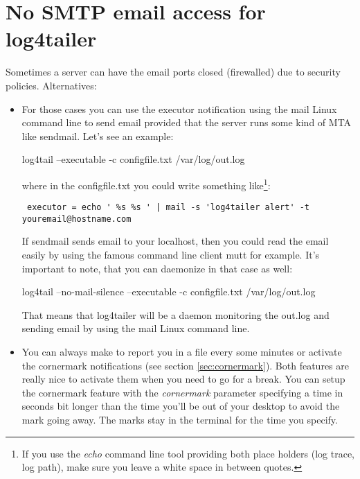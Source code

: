 \section{No SMTP email access for log4tailer}
Sometimes a server can have the email ports closed (firewalled) due to security policies. 
Alternatives:
\begin{itemize}
\item For those cases you can use the executor notification using the mail Linux command line to 
send email provided that the server runs some 
kind of MTA like sendmail. Let's see an example:
\begin{cmd}
 log4tail --executable -c configfile.txt /var/log/out.log
\end{cmd}
where in the configfile.txt you could write something like\footnote{If you use the 
\emph{echo} command line tool providing both place holders (log trace, log path), make 
sure you leave a white space in between quotes.}:
\begin{verbatim}
 executor = echo ' %s %s ' | mail -s 'log4tailer alert' -t youremail@hostname.com
\end{verbatim}
If sendmail sends email to your localhost, then you could read the email easily by using the 
famous command line client mutt for example. It's important to note, that you can daemonize 
\logftailer{} in that case as well:
\begin{cmd}
 log4tail --no-mail-silence --executable -c configfile.txt /var/log/out.log
\end{cmd}
That means that log4tailer will be a daemon monitoring the out.log and sending email by using 
the mail Linux command line. 

\item You can always make \logftailer{} to report you in a file every some minutes or 
activate the cornermark notifications (see section \ref{sec:cornermark}). 
Both features are really nice to activate them when 
you need to go for a break. You can setup the cornermark feature with the \emph{cornermark}
parameter specifying a time in seconds bit longer than the time you'll be out of your desktop
to avoid the mark going away. The marks stay in the terminal for the time you specify.
\end{itemize}


\newpage
